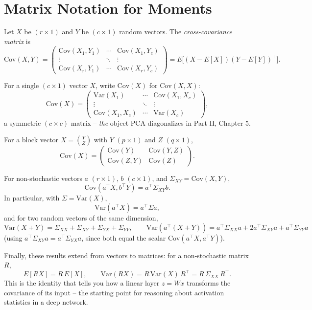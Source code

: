 \documentclass[11pt]{article}
\begin{document}
\section{Matrix Notation for Moments}

Let $X$ be $(r \times 1)$ and $Y$ be $(c \times 1)$ random vectors. The
\emph{cross-covariance matrix} is
\[
  \mathrm{Cov}(X,Y) =
  \begin{pmatrix}
    \mathrm{Cov}(X_1,Y_1) & \cdots & \mathrm{Cov}(X_1,Y_c) \\
    \vdots & \ddots & \vdots \\
    \mathrm{Cov}(X_r,Y_1) & \cdots & \mathrm{Cov}(X_r,Y_c)
  \end{pmatrix}
  = E\big[(X - E[X])(Y-E[Y])^\top\big].
\]

For a single $(c\times 1)$ vector $X$, write $\mathrm{Cov}(X)$ for
$\mathrm{Cov}(X,X)$:
\[
  \mathrm{Cov}(X) =
  \begin{pmatrix}
    \mathrm{Var}(X_1) & \cdots & \mathrm{Cov}(X_1,X_c) \\
    \vdots & \ddots & \vdots \\
    \mathrm{Cov}(X_1,X_c) & \cdots & \mathrm{Var}(X_c)
  \end{pmatrix},
\]
a symmetric $(c \times c)$ matrix -- \emph{the} object PCA diagonalizes in
Part II, Chapter 5.

For a block vector $X = \binom{Y}{Z}$ with $Y$ $(p\times 1)$ and $Z$
$(q\times 1)$,
\[
  \mathrm{Cov}(X) =
  \begin{pmatrix}
    \mathrm{Cov}(Y) & \mathrm{Cov}(Y,Z) \\
    \mathrm{Cov}(Z,Y) & \mathrm{Cov}(Z)
  \end{pmatrix}.
\]

For non-stochastic vectors $a$ $(r\times1)$, $b$ $(c\times1)$, and
$\Sigma_{XY} = \mathrm{Cov}(X,Y)$,
\[
  \mathrm{Cov}(a^\top X, b^\top Y) = a^\top \Sigma_{XY} b.
\]
In particular, with $\Sigma = \mathrm{Var}(X)$,
\[
  \mathrm{Var}(a^\top X) = a^\top \Sigma a,
\]
and for two random vectors of the same dimension,
\[
  \mathrm{Var}(X+Y) = \Sigma_{XX} + \Sigma_{XY} + \Sigma_{YX} + \Sigma_{YY},
  \qquad
  \mathrm{Var}(a^\top(X+Y)) = a^\top\Sigma_{XX}a + 2a^\top\Sigma_{XY}a +
  a^\top\Sigma_{YY}a
\]
(using $a^\top \Sigma_{XY} a = a^\top \Sigma_{YX} a$, since both equal the
scalar $\mathrm{Cov}(a^\top X, a^\top Y)$).

Finally, these results extend from vectors to matrices: for a
non-stochastic matrix $R$,
\[
  E[RX] = R\,E[X], \qquad
  \mathrm{Var}(RX) = R\,\mathrm{Var}(X)\,R^\top = R\,\Sigma_{XX}\,R^\top.
\]
This is the identity that tells you how a linear layer $z = Wx$ transforms
the covariance of its input -- the starting point for reasoning about
activation statistics in a deep network.
\end{document}
